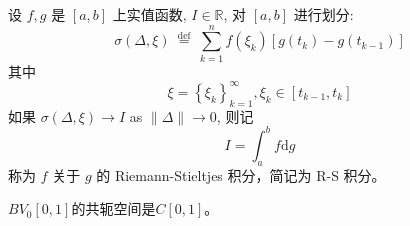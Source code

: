 \documentclass[lang=cn,newtx,10pt,scheme=chinese,thmcnt=chapter]{elegantbook}
\newcommand{\dif}{\mathrm{d}}
\begin{document}
\begin{definition}
设 $f, g$ 是 $[a, b]$ 上实值函数, $I \in \mathbb{R}$, 对 $[a, b]$ 进行划分:
\begin{equation*}
\sigma(\Delta, \xi) \stackrel{\text { def }}{=} \sum_{k=1}^n f\left(\xi_k\right)\left[g\left(t_k\right)-g\left(t_{k-1}\right)\right]
\end{equation*}
其中
\begin{equation*}
\xi=\left\{\xi_k\right\}_{k=1}^{\infty}, \xi_k \in\left[t_{k-1}, t_k\right]
\end{equation*}
如果 $\sigma(\Delta, \xi) \rightarrow I$ as $\|\Delta\| \rightarrow 0$, 则记
\begin{equation*}
I=\int_a^b f \dif g
\end{equation*}
称为 $f$ 关于 $g$ 的 Riemann-Stieltjes 积分，简记为 R-S 积分。
\end{definition}
\begin{proposition}
$BV_0[0,1]$的共轭空间是$C[0,1]$。
\end{proposition}
\end{document}
